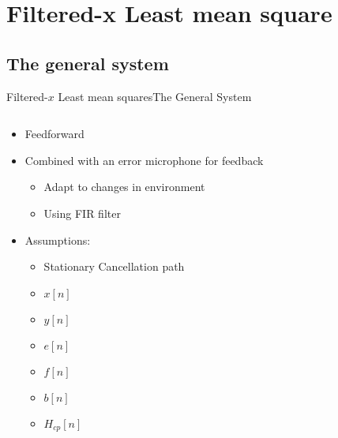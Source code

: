 \section{Filtered-x Least mean square}


\subsection{The general system}
\begin{frame}{Filtered-$x$ Least mean squares}{The General System}
	\begin{columns}
		\begin{column}{0.5\textwidth}		

		\begin{itemize}
		\item Feedforward
		\item Combined with an error microphone for feedback
		\begin{itemize}
		\item Adapt to changes in environment
		\item Using FIR filter		
		\end{itemize}
		\item Assumptions:
		\begin{itemize}
		\item Stationary Cancellation path
		\end{itemize}

		\begin{itemize}
			\setlength{\itemindent}{4em}
			\item[Input] $x[n]$
			\item[Output]$y[n]$
			\item[Error] $e[n]$	
			\item[Filtered x] $f[n]$
			\item[Filter coefficients] $b[n]$	
			\item[Cancellation Path] $H_{cp}[n]$		
		\end{itemize}

		\end{itemize}

		
		\end{column}
		\begin{column}{0.5\textwidth}
		\resizebox{1.1\columnwidth}{!}{	
		
		}
		\end{column}
	\end{columns}
\end{frame}


